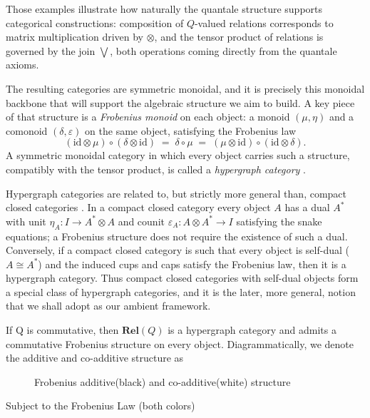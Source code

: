 Those examples illustrate how naturally the quantale structure supports  categorical constructions: composition of $Q$-valued relations corresponds  to matrix multiplication driven by $\otimes$, and the tensor product of  relations is governed by the join $\bigvee$, both operations coming  directly from the quantale axioms.

The resulting categories are symmetric monoidal, and it is precisely this monoidal backbone that will support the algebraic structure we aim to build. A key piece of that structure is a \emph{Frobenius monoid} on each object:  a monoid $(\mu, \eta)$ and a comonoid $(\delta, \varepsilon)$ on the same  object, satisfying the Frobenius law
\[
	(\mathrm{id} \otimes \mu) \circ (\delta \otimes \mathrm{id})
	\;=\;
	\delta \circ \mu
	\;=\;
	(\mu \otimes \mathrm{id}) \circ (\mathrm{id} \otimes \delta).
\]
A symmetric monoidal category in which every object carries such a  structure, compatibly with the tensor product, is called a  \emph{hypergraph category} \cite{fong2019hypergraph}.

Hypergraph categories are related to, but strictly more general than,
compact closed categories \cite{selinger2010survey}.
In a compact closed category every object $A$ has a dual $A^*$ with  unit $\eta_A : I \to A^* \otimes A$ and counit $\varepsilon_A : A \otimes A^* \to I$  satisfying the snake equations; a Frobenius structure does not require  the existence of such a dual. Conversely, if a compact closed category is such that every object is  self-dual ($A \cong A^*$) and the induced cups and caps satisfy the  Frobenius law, then it is a hypergraph category. Thus compact closed categories with self-dual
objects form a special  class of hypergraph categories, and it is the later, more general,  notion that we shall adopt as our ambient framework.
\begin{remark}
	If Q is commutative, then $\mathbf{Rel}(Q)$ is a hypergraph category and admits a commutative Frobenius structure on every object. Diagrammatically, we denote the additive and co-additive structure as

	\begin{figure}[H]
		\centering
		
		\caption{Frobenius additive(black) and co-additive(white) structure}
	\end{figure}

	Subject to the Frobenius Law (both colors)
	\begin{figure}[H]
		\centering
		
	\end{figure}
\end{remark}

